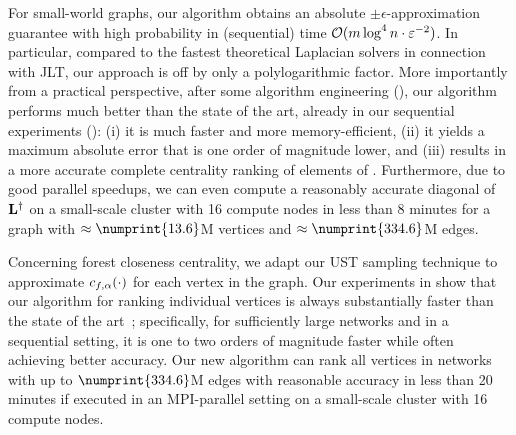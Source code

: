 For small-world graphs, our algorithm obtains an absolute
$\pm\epsilon$-approximation guarantee with high probability in (sequential)
time $\mathcal{O}(m\log^4n\cdot\varepsilon^{-2})$. In particular, compared to the fastest
theoretical Laplacian solvers in connection with JLT, our approach is off by
only a polylogarithmic factor. More importantly from a practical perspective,
after some algorithm engineering (), our algorithm
performs much better than the state of the art, already in our sequential
experiments (): (i) it is much faster and more
memory-efficient, (ii) it yields a maximum absolute error that is one order of
magnitude lower, and (iii) results in a more accurate complete centrality
ranking of elements of \diag{\Linv}. Furthermore, due to good parallel
speedups, we can even compute a reasonably accurate diagonal of $\mathbf{L}^\dagger$ on a
small-scale cluster with 16 compute nodes in less than 8 minutes for a graph
with $\approx\numprint{13.6}$M vertices and $\approx\numprint{334.6}$M edges.

Concerning forest closeness centrality, we adapt our UST sampling technique to
approximate $c_{f,\alpha}(\cdot)$ for each vertex in the graph. Our experiments
in  show that our algorithm for ranking individual
vertices is always substantially faster than the state of the
art~\cite{DBLP:conf/icdm/JinBZ19}; specifically, for sufficiently large
networks and in a sequential setting, it is one to two orders of magnitude faster
while often achieving better accuracy.
Our new algorithm can rank all vertices in
networks with up to $\numprint{334.6}$M edges with reasonable accuracy in less
than 20 minutes if executed in an MPI-parallel setting on a small-scale cluster
with 16 compute nodes.


